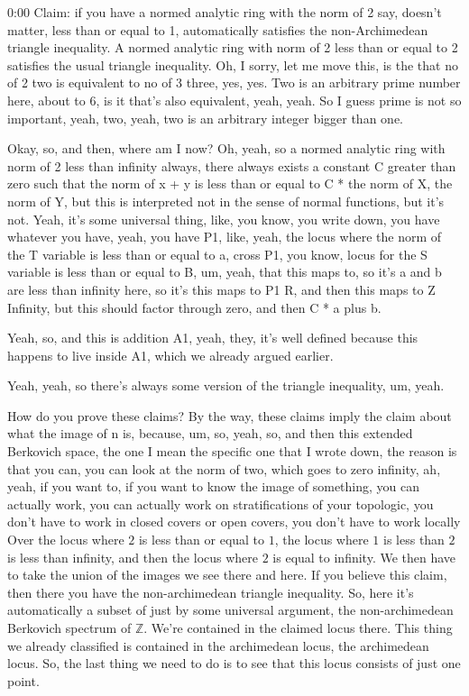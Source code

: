 \begin{unfinished}{0:00}
Claim: if you have a normed analytic ring with the norm of 2 say, doesn't matter, less than or equal to 1, automatically satisfies the non-Archimedean triangle inequality. A normed analytic ring with norm of 2 less than or equal to 2 satisfies the usual triangle inequality. Oh, I sorry, let me move this, is the that no of 2 two is equivalent to no of 3 three, yes, yes. Two is an arbitrary prime number here, about to 6, is it that's also equivalent, yeah, yeah. So I guess prime is not so important, yeah, two, yeah, two is an arbitrary integer bigger than one.

Okay, so, and then, where am I now? Oh, yeah, so a normed analytic ring with norm of 2 less than infinity always, there always exists a constant C greater than zero such that the norm of x + y is less than or equal to C * the norm of X, the norm of Y, but this is interpreted not in the sense of normal functions, but it's not. Yeah, it's some universal thing, like, you know, you write down, you have whatever you have, yeah, you have P1, like, yeah, the locus where the norm of the T variable is less than or equal to a, cross P1, you know, locus for the S variable is less than or equal to B, um, yeah, that this maps to, so it's a and b are less than infinity here, so it's this maps to P1 R, and then this maps to Z Infinity, but this should factor through zero, and then C * a plus b.

Yeah, so, and this is addition A1, yeah, they, it's well defined because this happens to live inside A1, which we already argued earlier.

Yeah, yeah, so there's always some version of the triangle inequality, um, yeah.

How do you prove these claims? By the way, these claims imply the claim about what the image of n is, because, um, so, yeah, so, and then this extended Berkovich space, the one I mean the specific one that I wrote down, the reason is that you can, you can look at the norm of two, which goes to zero infinity, ah, yeah, if you want to, if you want to know the image of something, you can actually work, you can actually work on stratifications of your topologic, you don't have to work in closed covers or open covers, you don't have to work locally
Over the locus where $2$ is less than or equal to $1$, the locus where $1$ is less than $2$ is less than infinity, and then the locus where $2$ is equal to infinity. We then have to take the union of the images we see there and here. If you believe this claim, then there you have the non-archimedean triangle inequality. So, here it's automatically a subset of just by some universal argument, the non-archimedean Berkovich spectrum of $\mathbb{Z}$. We're contained in the claimed locus there. This thing we already classified is contained in the archimedean locus, the archimedean locus. So, the last thing we need to do is to see that this locus consists of just one point.


\end{unfinished}
